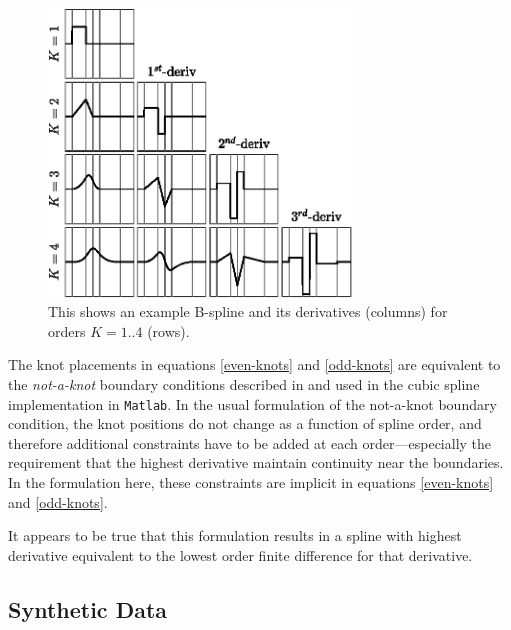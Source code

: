 \documentclass[10pt,journal]{IEEEtran}
\begin{document}
\begin{figure}
  \centerline{\includegraphics[width=19pc,angle=0]{figures/bsplines}}
  \caption{This shows an example B-spline and its derivatives (columns) for orders $K=1..4$ (rows).}
  \label{bsplines}
\end{figure}

The knot placements in equations \ref{even-knots} and \ref{odd-knots} are equivalent to the \textit{not-a-knot} boundary conditions described in \cite{deboor1978-book} and used in the cubic spline implementation in \texttt{Matlab}. In the usual formulation of the not-a-knot boundary condition, the knot positions do not change as a function of spline order, and therefore additional constraints have to be added at each order---especially the requirement that the highest derivative maintain continuity near the boundaries. In the formulation here, these constraints are implicit in equations \ref{even-knots} and \ref{odd-knots}.

It appears to be true that this formulation results in a spline with highest derivative equivalent to the lowest order finite difference for that derivative.

\subsection{Synthetic Data} \label{sec:synthetic_data}
\end{document}

